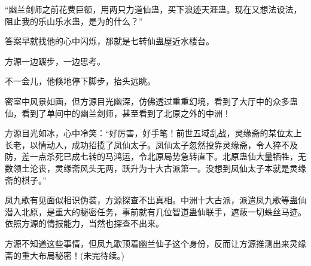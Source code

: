 \begin{this_body}
“幽兰剑师之前花费巨额，用两只力道仙蛊，买下浪迹天涯蛊。现在又想法设法，阻止我的乐山乐水蛊，是为的什么？”

答案早就找他的心中闪烁，那就是七转仙蛊屋近水楼台。

方源一边踱步，一边思考。

不一会儿，他倏地停下脚步，抬头远眺。

密室中风景如画，但方源目光幽深，仿佛透过重重幻境，看到了大厅中的众多蛊仙，看到了单间中的幽兰剑师，甚至看到了北原之外的中洲！

方源目光如冰，心中冷笑：“好厉害，好手笔！前世五域乱战，灵缘斋的某位太上长老，以情动人，成功招揽了凤仙太子。凤仙太子忽然投靠灵缘斋，令人猝不及防，差一点杀死已成七转的马鸿运，令北原局势急转直下。北原蛊仙大量牺牲，无数领土沦丧，灵缘斋风头无两，跃升为十大古派第一。没想到凤仙太子本就是灵缘斋的棋子。”

凤九歌有见面似相识伪装，方源探查不出真相。中洲十大古派，派遣凤九歌等蛊仙潜入北原，是重大的秘密任务，事前就有几位智道蛊仙联手，遮蔽一切蛛丝马迹。依照方源的情报能力，当然也探查不出来。

方源不知道这些事情，但凤九歌顶着幽兰仙子这个身份，反而让方源推测出来灵缘斋的重大布局秘密！(未完待续。)

\end{this_body}

